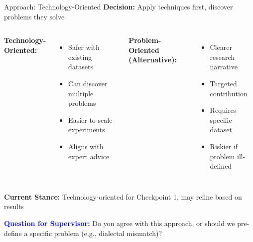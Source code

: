 \documentclass[aspectratio=169]{beamer}
\begin{document}
\begin{frame}{Approach: Technology-Oriented}
\textbf{Decision:} Apply techniques first, discover problems they solve

\vspace{0.3cm}

\begin{columns}
\textbf{Technology-Oriented:}
\begin{itemize}
    \item[+] Safer with existing datasets
    \item[+] Can discover multiple problems
    \item[+] Easier to scale experiments
    \item[+] Aligns with expert advice
\end{itemize}

\textbf{Problem-Oriented (Alternative):}
\begin{itemize}
    \item[+] Clearer research narrative
    \item[+] Targeted contribution
    \item[-] Requires specific dataset
    \item[-] Riskier if problem ill-defined
\end{itemize}
\end{columns}

\vspace{0.5cm}

\textbf{Current Stance:} Technology-oriented for Checkpoint 1, may refine based on results

\vspace{0.3cm}

\textcolor{blue}{\textbf{Question for Supervisor:}} Do you agree with this approach, or should we pre-define a specific problem (e.g., dialectal mismatch)?
\end{frame}
\end{document}
